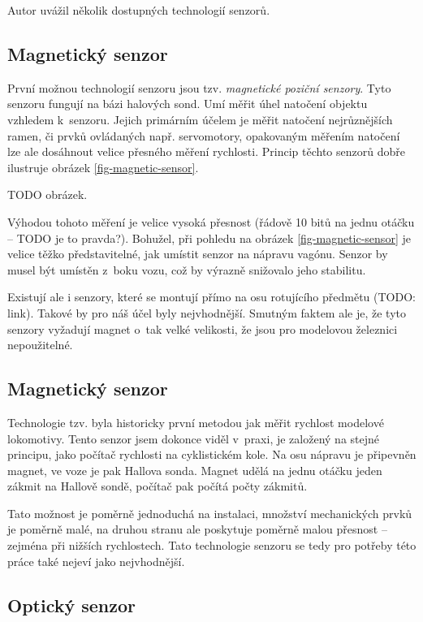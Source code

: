 Autor uvážil několik dostupných technologií senzorů.

\subsection{Magnetický senzor}
\label{subsec:wsm-senzor-mag}

První možnou technologií senzoru jsou tzv. \textit{magnetické poziční senzory}.
Tyto senzoru fungují na bázi halových sond. Umí měřit úhel natočení objektu
vzhledem k~senzoru. Jejich primárním účelem je měřit natočení nejrůznějších
ramen, či prvků ovládaných např. servomotory, opakovaným měřením natočení lze
ale dosáhnout velice přesného měření rychlosti. Princip těchto senzorů
dobře ilustruje obrázek \ref{fig-magnetic-sensor}.

TODO obrázek.

Výhodou tohoto měření je velice vysoká přesnost (řádově 10 bitů na jednu otáčku
-- TODO je to pravda?). Bohužel, při pohledu na obrázek
\ref{fig-magnetic-sensor} je velice těžko představitelné, jak umístit senzor na
nápravu vagónu. Senzor by musel být umístěn z~boku vozu, což by výrazně
snižovalo jeho stabilitu.

Existují ale i senzory, které se montují přímo na osu rotujícího předmětu
(TODO: link). Takové by pro náš účel byly nejvhodnější. Smutným faktem ale je,
že tyto senzory vyžadují magnet o~tak velké velikosti, že jsou pro modelovou
železnici nepoužitelné.

\subsection{Magnetický senzor }
\label{subsec:wsm-senzor-cyclo}

Technologie tzv.  byla historicky první metodou jak měřit
rychlost modelové lokomotivy. Tento senzor jsem dokonce viděl v~praxi, je
založený na stejné principu, jako počítač rychlosti na cyklistickém kole.
Na osu nápravu je připevněn magnet, ve voze je pak Hallova sonda. Magnet udělá
na jednu otáčku jeden zákmit na Hallově sondě, počítač pak počítá počty zákmitů.

Tato možnost je poměrně jednoduchá na instalaci, množství mechanických prvků
je poměrně malé, na druhou stranu ale poskytuje poměrně malou přesnost --
zejména při nižších rychlostech. Tato technologie senzoru se tedy pro potřeby
této práce také nejeví jako nejvhodnější.

\subsection{Optický senzor}
\label{subsec:wsm-senzor-opto}

